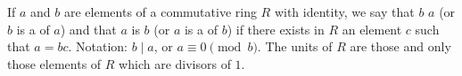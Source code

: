 If $a$ and $b$ are elements of a commutative ring $R$ with identity, we say that $b$  $a$ (or $b$ is a  of $a$) and that $a$ is  $b$ (or $a$ is a  of $b$) if there exists in $R$ an element $c$ such that $a = bc$. Notation: $b \mid a$, or $a \equiv 0 \pmod{b}$. The units of $R$ are those and only those elements of $R$ which are divisors of $1$.
